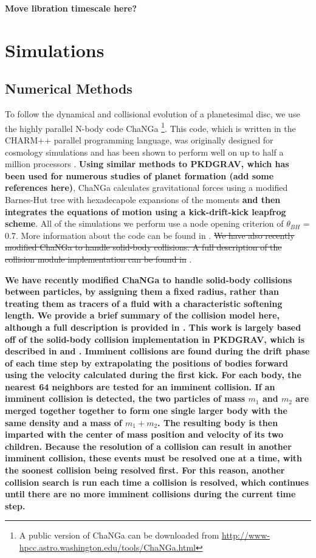 \documentclass[fleqn,usenatbib]{mnras}
\begin{document}
\textbf{Move libration timescale here?}

\section{Simulations} \label{sec:sims}

\subsection{Numerical Methods}\label{sec:methods}

To follow the dynamical and collisional evolution of a planetesimal disc, we use the highly parallel N-body code {\sc ChaNGa} 
\footnote{A public version of {\sc ChaNGa} can be downloaded from \url{http://www-hpcc.astro.washington.edu/tools/ChaNGa.html}}. 
This code, which is written in the {\sc CHARM++} parallel programming language, was originally designed for cosmology simulations 
and has been shown to perform well on up to half a million processors \citep{2015AphCom..2..1}. \textbf{Using similar methods to {\sc PKDGRAV}, which has been used for numerous studies of planet formation (add some references here)}, {\sc ChaNGa} calculates 
gravitational forces using a modified Barnes-Hut \citep{1986Natur.324..446B} tree with hexadecapole expansions of the moments \textbf{and then integrates the equations of motion using a kick-drift-kick leapfrog scheme}. 
All of the simulations we perform use a node opening criterion of $\theta_{BH}$ = 0.7. More information about the code can be found 
in \citet{2008IEEEpds...ChaNGa}. \sout{We have also recently modified {\sc ChaNGa} to handle solid-body collisions. A full description of 
the collision module implementation can be found in }\citet{2019MNRAS.489.2159W}.

\textbf{We have recently modified {\sc ChaNGa} to handle solid-body collisions between particles, by assigning them a fixed radius, rather than treating them as tracers of a fluid with a characteristic softening length. We provide a brief summary of the collision model here, although a full description is provided in \citet{2019MNRAS.489.2159W}. This work is largely based off of the solid-body collision implementation in {\sc PKDGRAV}, which is described in \citet{1994MNRAS.269..493R} and \citet{2000Icar..143...45R}. Imminent collisions are found during the drift phase of each time step by extrapolating the positions of bodies forward using the velocity calculated during the first kick. For each body, the nearest 64 neighbors are tested for an imminent collision. If an imminent collision is detected, the two particles of mass $m_{1}$ and $m_{2}$ are merged together together to form one single larger body with the same density and a mass of $m_{1} + m_{2}$. The resulting body is then imparted with the center of mass position and velocity of its two children. Because the resolution of a collision can result in another imminent collision, these events must be resolved one at a time, with the soonest collision being resolved first. For this reason, another collision search is run each time a collision is resolved, which continues until there are no more imminent collisions during the current time step.}
\end{document}
